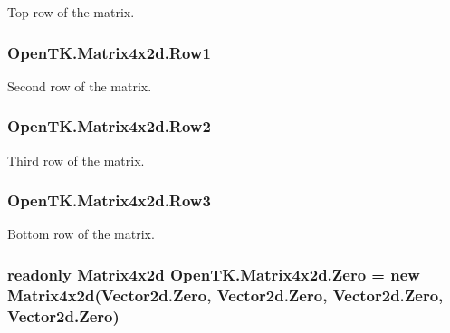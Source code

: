 Top row of the matrix. 

\hypertarget{struct_open_t_k_1_1_matrix4x2d_a620a5831b876a8543746d6828d6aaeb4}{
\subsubsection[{Row1}]{ Open\-T\-K.\-Matrix4x2d.\-Row1}}\label{struct_open_t_k_1_1_matrix4x2d_a620a5831b876a8543746d6828d6aaeb4}


Second row of the matrix. 

\hypertarget{struct_open_t_k_1_1_matrix4x2d_aeee8adbe3dcc186341e52e8b2b56d6a4}{
\subsubsection[{Row2}]{ Open\-T\-K.\-Matrix4x2d.\-Row2}}\label{struct_open_t_k_1_1_matrix4x2d_aeee8adbe3dcc186341e52e8b2b56d6a4}


Third row of the matrix. 

\hypertarget{struct_open_t_k_1_1_matrix4x2d_addbe352fa25f7c2ff87115b60c8361f3}{
\subsubsection[{Row3}]{ Open\-T\-K.\-Matrix4x2d.\-Row3}}\label{struct_open_t_k_1_1_matrix4x2d_addbe352fa25f7c2ff87115b60c8361f3}


Bottom row of the matrix. 

\hypertarget{struct_open_t_k_1_1_matrix4x2d_a1ca97c740ce1af90824f1a2d61c45900}{
\subsubsection[{Zero}]{\setlength{\rightskip}{0pt plus 5cm}readonly {\bf Matrix4x2d} Open\-T\-K.\-Matrix4x2d.\-Zero = new {\bf Matrix4x2d}(Vector2d.\-Zero, Vector2d.\-Zero, Vector2d.\-Zero, Vector2d.\-Zero)\hspace{0.3cm}{\ttfamily [static]}}}\label{struct_open_t_k_1_1_matrix4x2d_a1ca97c740ce1af90824f1a2d61c45900}


